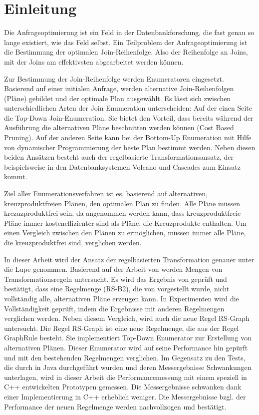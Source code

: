 \chapter{Einleitung}


Die Anfrageoptimierung ist ein Feld in der Datenbankforschung, die fast genau so lange existiert, wie das Feld selbst. Ein Teilproblem der Anfrageoptimierung ist die Bestimmung der optimalen Join-Reihenfolge. Also der Reihenfolge an Joins, mit der Joins am effektivsten abgearbeitet werden können.

Zur Bestimmung der Join-Reihenfolge werden Enumeratoren eingesetzt. Basierend auf einer initialen Anfrage, werden alternative Join-Reihenfolgen (Pläne) gebildet und der optimale Plan ausgewählt. Es lässt sich zwischen unterschiedlichen Arten der Join Enumeration unterscheiden: Auf der einen Seite die Top-Down Join-Enumeration. Sie bietet den Vorteil, dass bereits während der Ausführung die alternativen Pläne beschnitten werden können (Cost Based Pruning). Auf der anderen Seite kann bei der Bottom-Up Enumeration mit Hilfe von dynamischer Programmierung der beste Plan bestimmt werden. Neben diesen beiden Ansätzen besteht auch der regelbasierte Transformationsansatz, der beispielsweise in den Datenbanksystemen Volcano und Cascades zum Einsatz kommt.

Ziel aller Enumerationsverfahren ist es, basierend auf alternativen, kreuzproduktfreien Plänen, den optimalen Plan zu finden. Alle Pläne müssen krezuzproduktfrei sein, da angenommen werden kann, dass kreuzproduktfreie Pläne immer kosteneffizienter sind als Pläne, die Kreuzprodukte enthalten. Um einen Vergleich zwischen den Plänen zu ermöglichen, müssen immer alle Pläne, die kreuzproduktfrei sind, verglichen werden.




In dieser Arbeit wird der Ansatz der regelbasierten Transformation genauer unter die Lupe genommen. Basierend auf der Arbeit von \cite{shanbhag2014optimizing} werden Mengen von Transformationsregeln untersucht. Es wird das Ergebnis von \cite{shanbhag2014optimizing} geprüft und bestätigt, dass eine Regelmenge (RS-B2), die von \cite{pellenkoft1997complexity} vorgestellt wurde, nicht vollständig alle, alternativen Pläne erzeugen kann. In Experimenten wird die Vollständigkeit geprüft, indem die Ergebnisse mit anderen Regelmengen verglichen werden. Neben diesem Vergleich, wird auch die neue Regel RS-Graph untersucht. Die Regel RS-Graph ist eine neue Regelmenge, die aus der Regel GraphRule besteht. Sie implementiert Top-Down Enumerator zur Erstellung von alternativen Plänen. Dieser Enumerator wird auf seine Performance hin gepürft und mit den bestehenden Regelmengen verglichen. Im Gegensatz zu den Tests, die durch \cite{shanbhag2014optimizing} in Java durchgeführt wurden und deren Messergebnisse Schwankungen unterlagen, wird in dieser Arbeit die Performancemessung mit einem speziell in C++ entwickelten Prototypen gemessen. Die Messergebnisse schwanken dank einer Implementierung in C++ erheblich weniger. Die Messergebnisse bzgl. der Performance der neuen Regelmenge werden nachvollzogen und bestätigt.




